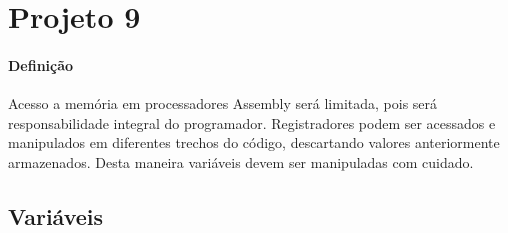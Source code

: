 \documentclass{article}
\begin{document}
    \section{Projeto 9}
        \paragraph{Definição}Acesso a memória em processadores Assembly será limitada, pois será responsabilidade integral do programador. Registradores podem ser acessados e manipulados em diferentes trechos do código, descartando valores anteriormente armazenados. Desta maneira variáveis devem ser manipuladas com cuidado.

        \subsection{Variáveis}
\end{document}
